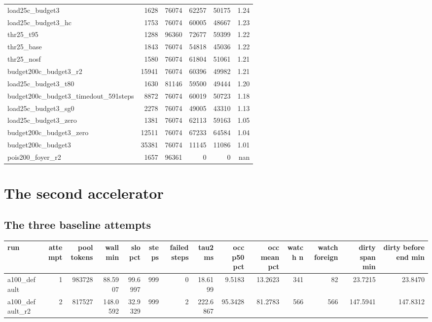 \documentclass[10pt]{article}
\begin{document}
\begin{center}
\begin{tabular}{lrrrrr}
load25c\_budget3 & 1628 & 76074 & 62257 & 50175 & 1.24 \\
load25c\_budget3\_hc & 1753 & 76074 & 60005 & 48667 & 1.23 \\
thr25\_t95 & 1288 & 96360 & 72677 & 59399 & 1.22 \\
thr25\_base & 1843 & 76074 & 54818 & 45036 & 1.22 \\
thr25\_nosf & 1580 & 76074 & 61804 & 51061 & 1.21 \\
budget200c\_budget3\_r2 & 15941 & 76074 & 60396 & 49982 & 1.21 \\
load25c\_budget3\_t80 & 1630 & 81146 & 59500 & 49444 & 1.20 \\
budget200c\_budget3\_timedout\_591steps & 8872 & 76074 & 60019 & 50723 & 1.18 \\
load25c\_budget3\_sg0 & 2278 & 76074 & 49005 & 43310 & 1.13 \\
load25c\_budget3\_zero & 1381 & 76074 & 62113 & 59163 & 1.05 \\
budget200c\_budget3\_zero & 12511 & 76074 & 67233 & 64584 & 1.04 \\
budget200c\_budget3 & 35381 & 76074 & 11145 & 11086 & 1.01 \\
pois200\_foyer\_r2 & 1657 & 96361 & 0 & 0 & nan \\
\bottomrule
\end{tabular}\end{center}

\section{The second accelerator}

\subsection{The three baseline attempts}


\begin{landscape}\begin{center}\footnotesize\setlength{\tabcolsep}{3pt}
\begin{tabular}{lrrrrrrrrrrrrr}
\toprule
run & attempt & pool tokens & wall min & slo pct & steps & failed steps & tau2 ms & occ p50 pct & occ mean pct & watch n & watch foreign & dirty span min & dirty before end min \\
\midrule
a100\_default & 1 & 983728 & 88.5907 & 99.6997 & 999 & 0 & 18.6199 & 9.5183 & 13.2623 & 341 & 82 & 23.7215 & 23.8470 \\
a100\_default\_r2 & 2 & 817527 & 148.0592 & 32.9329 & 999 & 2 & 222.6867 & 95.3428 & 81.2783 & 566 & 566 & 147.5941 & 147.8312 \\
\bottomrule
\end{tabular}\end{center}\end{landscape}
\end{document}
